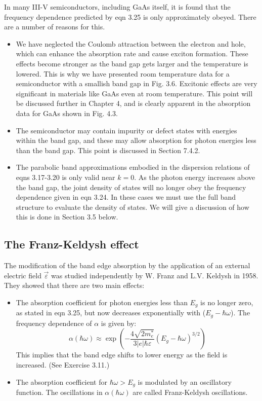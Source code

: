 \documentclass[12pt]{book}
\begin{document}
In many III-V semiconductors, including GaAs itself, it is found that the frequency dependence predicted by eqn 3.25 is only approximately obeyed. There are a number of reasons for this.
\begin{itemize}
  \item We have neglected the Coulomb attraction between the electron and hole, which can enhance the absorption rate and cause exciton formation. These effects become stronger as the band gap gets larger and the temperature is lowered. This is why we have presented room temperature data for a semiconductor with a smallish band gap in Fig. 3.6. Excitonic effects are very significant in materials like GaAs even at room temperature. This point will be discussed further in Chapter 4, and is clearly apparent in the absorption data for GaAs shown in Fig. 4.3.
  \item The semiconductor may contain impurity or defect states with energies within the band gap, and these may allow absorption for photon energies less than the band gap. This point is discussed in Section 7.4.2.
  \item The parabolic band approximations embodied in the dispersion relations of eqns 3.17-3.20 is only valid near $k = 0$. As the photon energy increases above the band gap, the joint density of states will no longer obey the frequency dependence given in eqn 3.24. In these cases we must use the full band structure to evaluate the density of states. We  will give a discussion of how this is done in Section 3.5 below.
\end{itemize}

\subsection{The Franz-Keldysh effect}

The modification of the band edge absorption by the application of an external electric field $\vec{\varepsilon}$ was studied independently by W. Franz and L.V. Keldysh in 1958. They showed that there are two main effects:
\begin{itemize}
  \item The absorption coefficient for photon energies less than $E_g$ is no longer zero, as stated in eqn 3.25, but now decreases exponentially with ($E_g - \hbar\omega$). The frequency dependence of $\alpha$ is given by:
      \begin{equation}\label{equa:3.26}
        \alpha(\hbar\omega)\approx\exp\left(-\frac{4\sqrt{2m_e^*}}{3|e|\hbar\varepsilon}(E_g-\hbar\omega)^{3/2}\right)
      \end{equation}
      This implies that the band edge shifts to lower energy as the field is increased. (See Exercise 3.11.)
  \item The absorption coefficient for $\hbar\omega>E_g$ is modulated by an oscillatory function. The oscillations in $\alpha(\hbar\omega)$ are called Franz-Keldysh oscillations.
\end{itemize}
\end{document}

